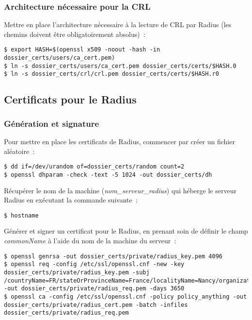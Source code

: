 \subsubsection{Architecture nécessaire pour la CRL}

Mettre en place l'architecture nécessaire à la lecture de CRL par Radius (les chemins doivent être obligatoirement absolus)~:

\begin{lstlisting}
$ export HASH=$(openssl x509 -noout -hash -in dossier_certs/users/ca_cert.pem)
$ ln -s dossier_certs/users/ca_cert.pem dossier_certs/certs/$HASH.0
$ ln -s dossier_certs/crl/crl.pem dossier_certs/certs/$HASH.r0
\end{lstlisting}

\subsection{Certificats pour le Radius}
\subsubsection{Génération et signature}

Pour mettre en place les certificats de Radius, commencer par créer un fichier aléatoire~: 

\begin{lstlisting}
$ dd if=/dev/urandom of=dossier_certs/random count=2
$ openssl dhparam -check -text -5 1024 -out dossier_certs/dh
\end{lstlisting}

Récupérer le nom de la machine (\emph{nom\_serveur\_radius}) qui héberge le serveur Radius en exécutant la commande suivante~:

\begin{lstlisting}
$ hostname
\end{lstlisting}

Générer et signer un certificat pour le Radius, en prenant soin de définir le champ \emph{commonName} à l'aide du nom de la machine du serveur~:

\begin{lstlisting}
$ openssl genrsa -out dossier_certs/private/radius_key.pem 4096
$ openssl req -config /etc/ssl/openssl.cnf -new -key dossier_certs/private/radius_key.pem -subj /countryName=FR/stateOrProvinceName=France/localityName=Nancy/organizationName=BHConsulting/commonName=nom_serveur_radius/ -out dossier_certs/private/radius_req.pem -days 3650
$ openssl ca -config /etc/ssl/openssl.cnf -policy policy_anything -out dossier_certs/private/radius_cert.pem -batch -infiles dossier_certs/private/radius_req.pem
\end{lstlisting}

